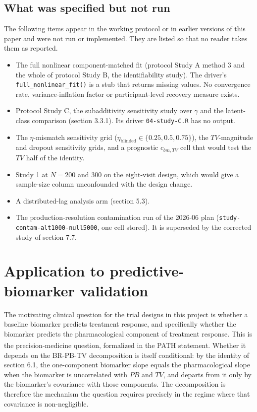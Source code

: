 \documentclass[
  11pt,
]{article}
\providecommand{\tightlist}{%
  \setlength{\itemsep}{0pt}\setlength{\parskip}{0pt}}
\begin{document}
\subsection{What was specified but not run}\label{what-was-specified-but-not-run}

The following items appear in the working protocol or in earlier versions
of this paper and were not run or implemented. They are listed so that no
reader takes them as reported.

\begin{itemize}
\tightlist
\item
  The full nonlinear component-matched fit (protocol Study A method 3
  and the whole of protocol Study B, the identifiability study). The
  driver's \texttt{full\_nonlinear\_fit()} is a stub that returns
  missing values. No convergence rate, variance-inflation factor or
  participant-level recovery measure exists.
\item
  Protocol Study C, the subadditivity sensitivity study over \(\gamma\)
  and the latent-class comparison (section 3.3.1). Its driver
  \texttt{04-study-C.R} has no output.
\item
  The \(\eta\)-mismatch sensitivity grid (\(\eta_{\text{blinded}} \in
  \{0.25, 0.5, 0.75\}\)), the \(TV\)-magnitude and dropout sensitivity
  grids, and a prognostic \(c_{bm,TV}\) cell that would test the \(TV\) half
  of the identity.
\item
  Study 1 at \(N = 200\) and \(300\) on the eight-visit design, which would
  give a sample-size column unconfounded with the design change.
\item
  A distributed-lag analysis arm (section 5.3).
\item
  The production-resolution contamination run of the 2026-06 plan
  (\texttt{study-contam-alt1000-null5000}, one cell stored). It is
  superseded by the corrected study of section 7.7.
\end{itemize}

\section{Application to predictive-biomarker validation}\label{application-to-predictive-biomarker-validation}

The motivating clinical question for the trial designs in this project is
whether a baseline biomarker predicts treatment response, and specifically
whether the biomarker predicts the pharmacological component of treatment
response. This is the precision-medicine question, formalized in the PATH
statement\textsuperscript{}. Whether it depends on the BR-PB-TV decomposition is
itself conditional: by the identity of section 6.1, the one-component
biomarker slope equals the pharmacological slope when the biomarker is
uncorrelated with \(PB\) and \(TV\), and departs from it only by the biomarker's
covariance with those components. The decomposition is therefore the mechanism
the question requires precisely in the regime where that covariance is
non-negligible.
\end{document}
